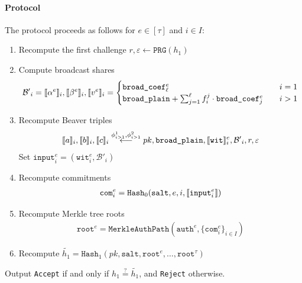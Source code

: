 \documentclass[11pt]{report}
\theoremstyle{definition}
\theoremstyle{plain}
\begin{document}
\begin{protocol}
  \paragraph{Protocol} The protocol proceeds as follows for $e \in [\tau]$ and $i \in I$:
  \begin{enumerate}[itemsep=0pt, topsep=0pt, parsep=0pt]
    \item Recompute the first challenge $r, \varepsilon \leftarrow \texttt{PRG}(h_1)$
    \item Compute broadcast shares
          \begin{align*}
            \mathcal{B'}_i = \llbracket \alpha^e \rrbracket_i, \llbracket \beta^e \rrbracket_i, \llbracket v^e \rrbracket_i =
            \begin{cases}
              \texttt{broad\_coef}^e_\ell                                                  & \quad i = 1 \\
              \texttt{broad\_plain} + \sum_{j=1}^\ell f_i^j \cdot \texttt{broad\_coef}_j^e & \quad i > 1
            \end{cases}
          \end{align*}
    \item Recompute Beaver triples
          \begin{align*}
            \llbracket a \rrbracket_i, \llbracket b \rrbracket_i, \llbracket c \rrbracket_i \stackrel{\phi^1_{i > 1}, \phi^2_{i > 1}}{\longleftarrow} pk, \texttt{broad\_plain}, \llbracket \texttt{wit} \rrbracket_i^e, \mathcal{B'}_i, r, \varepsilon
          \end{align*}
          Set $\texttt{input}^e_i = (\texttt{wit}_i^e, \mathcal{B'}_i)$
    \item Recompute commitments
          \begin{align*}
            \texttt{com}^e_i = \texttt{Hash}_0(\texttt{salt}, e, i, \llbracket \texttt{input}^e_i \rrbracket)
          \end{align*}
    \item Recompute Merkle tree roots
          \begin{align*}
            \texttt{root}^e = \texttt{MerkleAuthPath}(\texttt{auth}^e,\{\texttt{com}^e_i\}_{i \in I})
          \end{align*}
    \item Recompute $\tilde{h_1} = \texttt{Hash}_1(pk, \texttt{salt}, \texttt{root}^e, \ldots, \texttt{root}^{\tau})$
  \end{enumerate}

  Output \texttt{Accept} if and only if $h_1 \stackrel{?}{=} \tilde{h_1}$, and \texttt{Reject} otherwise.

\end{protocol}
\end{document}
